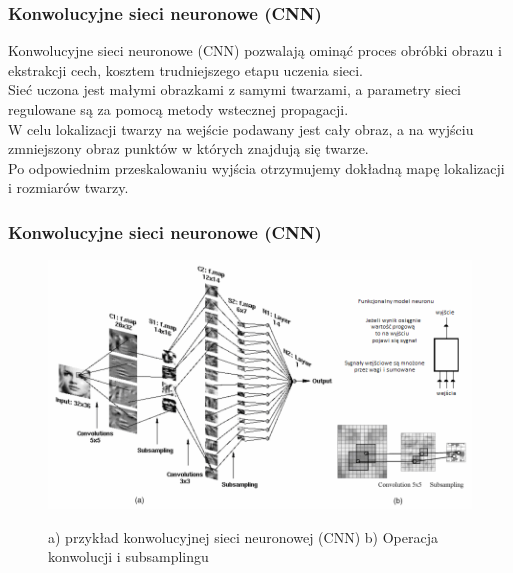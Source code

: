 \documentclass[xcolor=table]{beamer}
\begin{document}
\begin{frame}
  \frametitle{Konwolucyjne sieci neuronowe (CNN)}

 {
Konwolucyjne sieci neuronowe (CNN) pozwalają ominąć proces obróbki obrazu i ekstrakcji cech, kosztem trudniejszego etapu uczenia sieci.\\[\baselineskip]
}
 {
Sieć uczona jest małymi obrazkami z samymi twarzami, a parametry sieci regulowane są za pomocą metody wstecznej propagacji.\\[\baselineskip]
}
 {
W celu lokalizacji twarzy na wejście podawany jest cały obraz, a na wyjściu zmniejszony obraz punktów w których znajdują się twarze.\\[\baselineskip]
}
 {
Po odpowiednim przeskalowaniu wyjścia otrzymujemy dokładną mapę lokalizacji i rozmiarów twarzy.
}
\end{frame}

\begin{frame}
  \frametitle{Konwolucyjne sieci neuronowe (CNN)}

	\begin{figure}
    		 {\includegraphics[scale=0.4]{cnn.png}}
		\caption{a) przykład konwolucyjnej sieci neuronowej (CNN) b) Operacja konwolucji i subsamplingu}
	\end{figure}

\end{frame}
\end{document}
